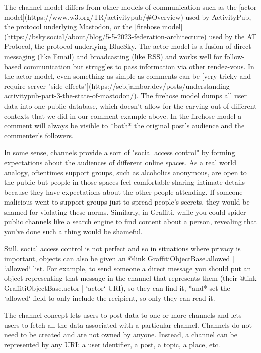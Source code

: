 The channel model differs from other models of communication such as the
[actor model](https://www.w3.org/TR/activitypub/#Overview) used by ActivityPub,
the protocol underlying Mastodon, or the [firehose model](https://bsky.social/about/blog/5-5-2023-federation-architecture)
used by the AT Protocol, the protocol underlying BlueSky.
The actor model is a fusion of direct messaging (like Email) and broadcasting
(like RSS) and works well for follow-based communication but struggles
to pass information via other rendez-vous.
In the actor model, even something as simple as comments can be
[very tricky and require server "side effects"](https://seb.jambor.dev/posts/understanding-activitypub-part-3-the-state-of-mastodon/).
The firehose model dumps all user data into one public database,
which doesn't allow for the carving out of different contexts that we did in our comment
example above. In the firehose model a comment will always be visible to *both* the original post's audience and
the commenter's followers.

In some sense, channels provide a sort of "social access control" by forming
expectations about the audiences of different online spaces.
As a real world analogy, oftentimes support groups, such as alcoholics
anonymous, are open to the public but people in those spaces feel comfortable sharing intimate details
because they have expectations about the other people attending.
If someone malicious went to support groups just to spread people's secrets,
they would be shamed for violating these norms.
Similarly, in Graffiti, while you could spider public channels like a search engine
to find content about a person, revealing that you've done such a thing
would be shameful.

Still, social access control is not perfect and so in situations where privacy is important,
objects can also be given
an {@link GraffitiObjectBase.allowed | `allowed`} list.
For example, to send someone a direct message you should put an object representing
that message in the channel that represents them (their {@link GraffitiObjectBase.actor | `actor` URI}),
so they can find it, *and* set the `allowed` field to only include the recipient,
so only they can read it.

The channel concept lets users to post data to one or more channels and lets users to fetch all the data associated with a particular channel.
Channels do not need to be created and are not owned by anyone. Instead, a channel can be represented by any URI: a user identifier, a post, a topic, a place, etc.

